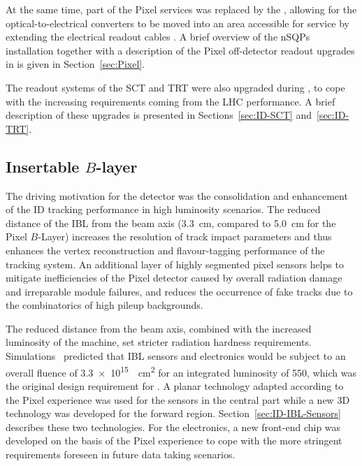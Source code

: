 \documentclass[cernpreprint, atlasdraft=false, UKenglish,british,orcidlogo, texmf, orcidlogo]{atlasdoc}
\begin{document}
At the same time, part of the Pixel services was replaced by the , allowing for the optical-to-electrical converters to be moved into an area accessible for service by extending the 
electrical readout cables
.
A brief overview of the \glspl{nSQP}  installation together with a description of the Pixel off-detector readout upgrades in \RunTwo is given in Section~\ref{sec:Pixel}.
 
The readout systems of the \gls{SCT} and \gls{TRT} were also upgraded during \RunTwo, to cope with the increasing requirements coming from the \gls{LHC} performance. A brief description of these upgrades is presented in Sections~\ref{sec:ID-SCT} and~\ref{sec:ID-TRT}.
 
 


 

 
\subsection{Insertable $B$-layer}
\label{sec:ID-IBL}
 
The driving motivation for the  detector was the consolidation and enhancement of the \gls{ID} tracking performance in high luminosity scenarios. The reduced distance of the \gls{IBL} from the beam axis (\SI{3.3}{\cm}, compared to \SI{5.0}{\cm} for the Pixel $B$-Layer) increases the resolution of track impact parameters and thus enhances the vertex reconstruction and flavour-tagging performance of the tracking system.  An additional layer of highly segmented pixel sensors helps to mitigate inefficiencies of the Pixel detector caused by overall radiation damage and irreparable module failures, and reduces the occurrence of fake tracks due to the combinatorics of high pileup backgrounds.
 
The reduced distance from the beam axis, combined with the increased luminosity of the machine, set stricter radiation hardness requirements.
Simulations~\cite{ATLAS-TDR-19} predicted that \gls{IBL} sensors  and electronics would be subject to an overall fluence \phieqv of \SI{3.3e15}{\per\cm\squared}
for an integrated luminosity of \SI{550}{\ifb}, which was the original design requirement for \RunThr.
A planar technology adapted according to the \RunOne Pixel experience was used for the sensors in the central part while a new 3D technology was developed for the forward region. Section~\ref{sec:ID-IBL-Sensors} describes these two technologies.
For the electronics, a new front-end chip was developed on the basis of the  \RunOne Pixel experience to cope with the more stringent
requirements foreseen in future data taking scenarios.
 
\end{document}
